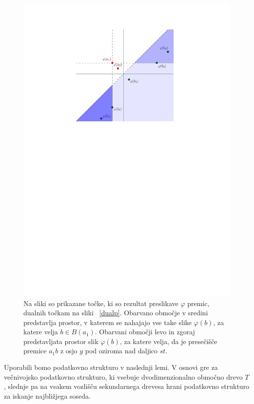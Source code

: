 \documentclass[a4paper, 12pt]{book}
\begin{document}
\begin{figure}
\centerline{\includegraphics[scale=1]{pics/dual_problem4.pdf}}
\caption{Na sliki so prikazane točke, ki so rezultat preslikave $\varphi$ premic, dualnih točkam na sliki ~\ref{dualp}. Obarvano območje v sredini predstavlja prostor, v katerem se nahajajo vse take slike $\varphi (b)$, za katere velja $b \in B(a_1)$. Obarvani območji levo in zgoraj predstavljata prostor slik $\varphi (b)$, za katere velja, da je presečišče premice $a_1b$ z osjo $y$ pod oziroma nad daljico $st$.} 
\label{dualp2}
\end{figure}

Uporabili bomo podatkovno strukturo v naslednji lemi. V osnovi gre za večnivojsko podatkovno strukturo, ki vsebuje dvodimenzionalno območno drevo $T$, slednje pa na vsakem vozlišču sekundarnega drevesa hrani podatkovno strukturo za iskanje najbližjega soseda. 
\end{document}
